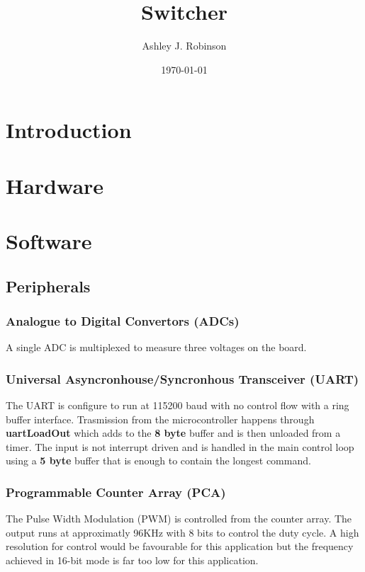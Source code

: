\documentclass[12pt]{article}%
\begin{document}
\title{Switcher}
\author{Ashley J. Robinson}
\date{\today}
\maketitle
\section{Introduction}


\section{Hardware}


\section{Software}

\subsection{Peripherals}

\subsubsection{Analogue to Digital Convertors (ADCs)}

A single ADC is multiplexed to measure three voltages on the board. 

\subsubsection{Universal Asyncronhouse/Syncronhous Transceiver (UART)}

The UART is configure to run at 115200 baud with no control flow with a ring buffer interface. Trasmission from the microcontroller happens through \textbf{uartLoadOut} which adds to the \textbf{8 byte} buffer and is then unloaded from a timer. The input is not interrupt driven and is handled in the main control loop using a \textbf{5 byte} buffer that is enough to contain the longest command.

\subsubsection{Programmable Counter Array (PCA)}

The Pulse Width Modulation (PWM) is controlled from the counter array. The output runs at approximatly 96KHz with 8 bits to control the duty cycle. A high resolution for control would be favourable for this application but the frequency achieved in 16-bit mode is far too low for this application.
\end{document}
